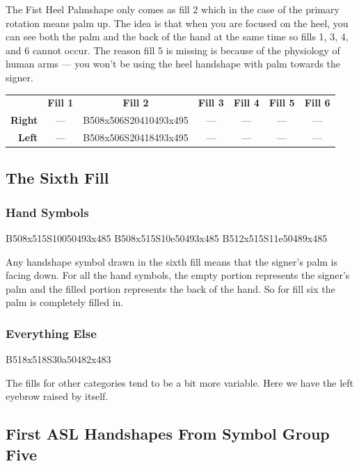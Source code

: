 \documentclass{article}
\begin{document}
The Fist Heel Palmshape only comes as fill 2 which in the case of the primary rotation means palm up.
The idea is that when you are focused on the heel, you can see both the palm and the back of the hand at the same time so fills 1, 3, 4, and 6 cannot occur.
The reason fill 5 is missing is because of the physiology of human arms --- you won't be using the heel handshape with palm towards the signer.

\begin{center}
\begin{tabular}{r*{6}{c}}
&\textbf{Fill 1}&\textbf{Fill 2}&\textbf{Fill 3}&\textbf{Fill 4}&\textbf{Fill 5}&\textbf{Fill 6}\\
\textbf{Right}&---&B508x506S20410493x495&---&---&---&---\\
\textbf{Left} &---&B508x506S20418493x495&---&---&---&---\\
\end{tabular}
\end{center}

\subsection{The Sixth Fill}

\subsubsection{Hand Symbols}

\begin{center}
B508x515S10050493x485 B508x515S10e50493x485 B512x515S11e50489x485
\end{center}

Any handshape symbol drawn in the sixth fill means that the signer's palm is facing down.
For all the hand symbols, the empty portion represents the signer's palm and the filled portion represents the back of the hand.
So for fill six the palm is completely filled in.

\subsubsection{Everything Else}

\begin{center}
B518x518S30a50482x483
\end{center}

The fills for other categories tend to be a bit more variable.
Here we have the left eyebrow raised by itself.

\subsection{First ASL Handshapes From Symbol Group Five}
\end{document}

